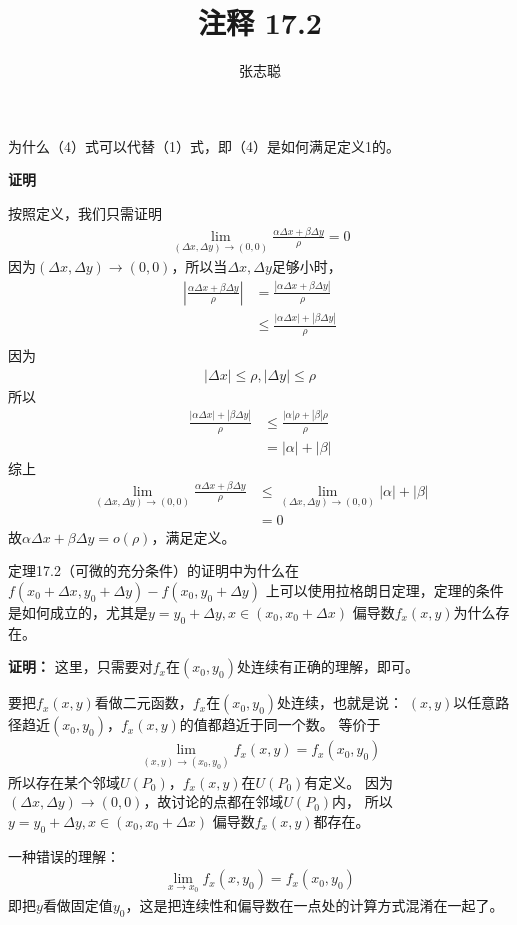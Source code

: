 \documentclass{article}
\begin{document}
\title{注释 17.2}
\author{张志聪}
\maketitle

\begin{zremark}
  为什么（4）式可以代替（1）式，即（4）是如何满足定义1的。
\end{zremark}

\textbf{证明}

按照定义，我们只需证明
\begin{align*}
  \lim\limits_{(\Delta x, \Delta y) \to (0, 0)} \frac{\alpha \Delta x + \beta \Delta y}{\rho} = 0 
\end{align*}
因为$(\Delta x, \Delta y) \to (0, 0)$，所以当$\Delta x, \Delta y$足够小时，
\begin{align*}
  | \frac{\alpha \Delta x + \beta \Delta y}{\rho} |
  & = \frac{|\alpha \Delta x + \beta \Delta y|}{\rho} \\
  & \leq \frac{|\alpha \Delta x|  + |\beta \Delta y|}{\rho} \\
\end{align*}
因为
\begin{align*}
  |\Delta x| \leq \rho, |\Delta y| \leq \rho
\end{align*}
所以
\begin{align*}
  \frac{|\alpha \Delta x|  + |\beta \Delta y|}{\rho}
  & \leq \frac{|\alpha| \rho  + |\beta| \rho}{\rho} \\
  & = |\alpha| + |\beta|
\end{align*}
综上
\begin{align*}
  \lim\limits_{(\Delta x, \Delta y) \to (0, 0)} \frac{\alpha \Delta x + \beta \Delta y}{\rho}
  & \leq \lim\limits_{(\Delta x, \Delta y) \to (0, 0)} |\alpha| + |\beta| \\
  & = 0
\end{align*}
故$\alpha \Delta x + \beta \Delta y = o(\rho)$，满足定义。

\begin{zremark}
  定理17.2（可微的充分条件）的证明中为什么在$f(x_0 + \Delta x, y_0 + \Delta y) - f(x_0, y_0 + \Delta y)$
  上可以使用拉格朗日定理，定理的条件是如何成立的，尤其是$y = y_0 + \Delta y, x \in (x_0, x_0 + \Delta x)$
  偏导数$f_x(x, y)$为什么存在。
\end{zremark}

\textbf{证明：}
这里，只需要对$f_x$在$(x_0, y_0)$处连续有正确的理解，即可。

要把$f_x(x, y)$看做二元函数，$f_x$在$(x_0, y_0)$处连续，也就是说：
$(x, y)$以任意路径趋近$(x_0, y_0)$，$f_x(x, y)$的值都趋近于同一个数。
等价于
\begin{align*}
  \lim\limits_{(x, y) \to (x_0, y_0)} f_x(x, y) = f_x(x_0, y_0)
\end{align*}
所以存在某个邻域$U(P_0)$，$f_x(x, y)$在$U(P_0)$有定义。
因为$(\Delta x, \Delta y) \to (0, 0)$，故讨论的点都在邻域$U(P_0)$内，
所以$y = y_0 + \Delta y, x \in (x_0, x_0 + \Delta x)$
偏导数$f_x(x, y)$都存在。

一种错误的理解：
\begin{align*}
  \lim\limits_{x \to x_0} f_x(x, y_0) = f_x(x_0, y_0)
\end{align*}
即把$y$看做固定值$y_0$，这是把连续性和偏导数在一点处的计算方式混淆在一起了。
\end{document}
